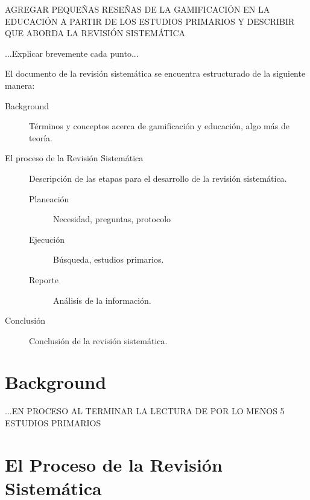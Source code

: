 \documentclass{report}
\begin{document}
    AGREGAR PEQUEÑAS RESEÑAS DE LA GAMIFICACIÓN EN LA EDUCACIÓN A PARTIR DE LOS ESTUDIOS PRIMARIOS 
    Y DESCRIBIR QUE ABORDA LA REVISIÓN SISTEMÁTICA    
    
    ...Explicar brevemente cada punto...
    
    El documento de la revisión sistemática se encuentra estructurado de la siguiente manera:
    \begin{description}
        \item[Background] Términos y conceptos acerca de gamificación y educación, algo más de teoría.
        \item[El proceso de la Revisión Sistemática] Descripción de las etapas para el desarrollo de la revisión sistemática.
        \begin{description}
            \item[Planeación] Necesidad, preguntas, protocolo
            \item[Ejecución] Búsqueda, estudios primarios.
            \item[Reporte] Análisis de la información.
        \end{description}
        \item[Conclusión] Conclusión de la revisión sistemática.
    \end{description}    
    
    \section{Background}\label{back}
        ...EN PROCESO AL TERMINAR LA LECTURA DE POR LO MENOS 5 ESTUDIOS PRIMARIOS
    
    \section{El Proceso de la Revisión Sistemática}
    
\end{document}
